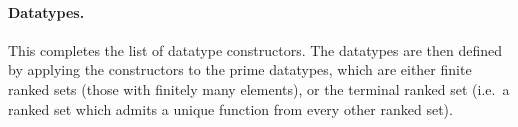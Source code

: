 %
%








\paragraph*{Datatypes.} This completes the list of  datatype constructors. The datatypes are then defined by applying the constructors to the prime datatypes, which are either finite ranked sets (those with finitely many elements), or  the terminal ranked set (i.e.~a ranked set which admits a unique function from every other ranked set).



